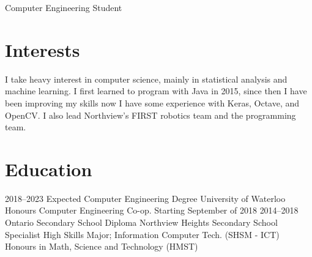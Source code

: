 \documentclass[]{chandan-cv}
\begin{document}
       {Computer Engineering Student}



\section{Interests}

I take heavy interest in computer science, mainly in statistical analysis and machine learning. I first learned to program with Java in 2015, since then I have been improving my skills now I have some experience with Keras, Octave, and OpenCV. I also lead Northview's FIRST robotics team and the programming team.

\section{Education}

\begin{entrylist}
  \entry
    {2018–2023}
    {Expected Computer Engineering Degree{\normalfont}}
    {University of Waterloo}
    {Honours Computer Engineering Co-op. Starting September of 2018}
  \entry
    {2014–2018}
    {Ontario Secondary School Diploma{\normalfont}}
    {Northview Heights Secondary School}
    {Specialist High Skills Major; Information Computer Tech. (SHSM - ICT)\\
    Honours in Math, Science and Technology (HMST)}
\end{entrylist}
\end{document}
